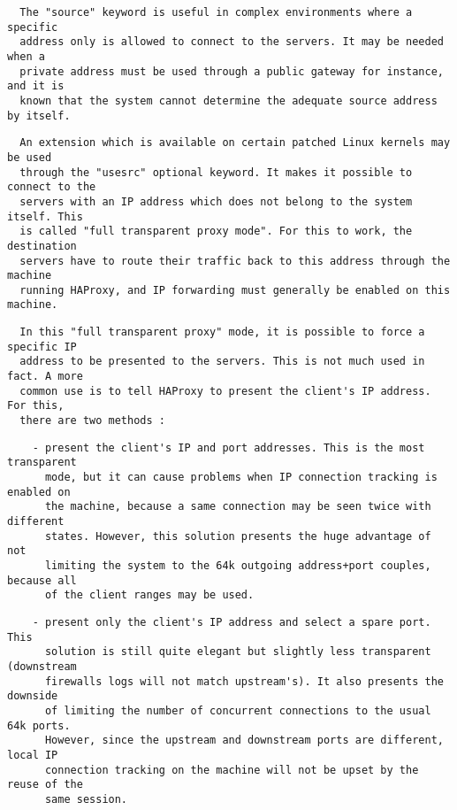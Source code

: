 \begin{verbatim}
  The "source" keyword is useful in complex environments where a specific
  address only is allowed to connect to the servers. It may be needed when a
  private address must be used through a public gateway for instance, and it is
  known that the system cannot determine the adequate source address by itself.
\end{verbatim}

\begin{verbatim}
  An extension which is available on certain patched Linux kernels may be used
  through the "usesrc" optional keyword. It makes it possible to connect to the
  servers with an IP address which does not belong to the system itself. This
  is called "full transparent proxy mode". For this to work, the destination
  servers have to route their traffic back to this address through the machine
  running HAProxy, and IP forwarding must generally be enabled on this machine.
\end{verbatim}

\begin{verbatim}
  In this "full transparent proxy" mode, it is possible to force a specific IP
  address to be presented to the servers. This is not much used in fact. A more
  common use is to tell HAProxy to present the client's IP address. For this,
  there are two methods :
\end{verbatim}

\begin{verbatim}
    - present the client's IP and port addresses. This is the most transparent
      mode, but it can cause problems when IP connection tracking is enabled on
      the machine, because a same connection may be seen twice with different
      states. However, this solution presents the huge advantage of not
      limiting the system to the 64k outgoing address+port couples, because all
      of the client ranges may be used.
\end{verbatim}

\begin{verbatim}
    - present only the client's IP address and select a spare port. This
      solution is still quite elegant but slightly less transparent (downstream
      firewalls logs will not match upstream's). It also presents the downside
      of limiting the number of concurrent connections to the usual 64k ports.
      However, since the upstream and downstream ports are different, local IP
      connection tracking on the machine will not be upset by the reuse of the
      same session.
\end{verbatim}

